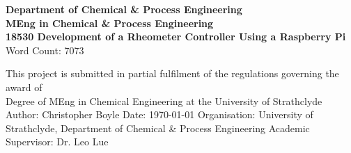 \documentclass[twoside,a4]{report}
\def\atitle{Development of a Rheometer Controller Using a Raspberry Pi}
\def\thewords{7073} %
\begin{document}
	\begin{titlepage}
		\centering
		\vskip3cm
		{
			\bfseries\Large
			Department of Chemical \& Process Engineering\\
			\vskip1cm
			MEng in Chemical \& Process Engineering\\
			18530
			\vskip3cm
			\LARGE\atitle
		}
		\vskip3cm
		{\small Word Count: \thewords}
		\vskip1cm
		\begin{flushleft}
			This project is submitted in partial fulfilment of the regulations governing the award of \\
			Degree of MEng in Chemical Engineering at the University of Strathclyde
			\vskip2cm
			Author: Christopher Boyle \hfill Date: \today \newline
			\vskip1cm
			Organisation: University of Strathclyde, Department of Chemical \& Process Engineering \newline
			Academic Supervisor: Dr. Leo Lue
		\end{flushleft}
	\end{titlepage}

	\setcounter{page}{0}
	\begin{center}\newpage \end{center}
	
\end{document}
